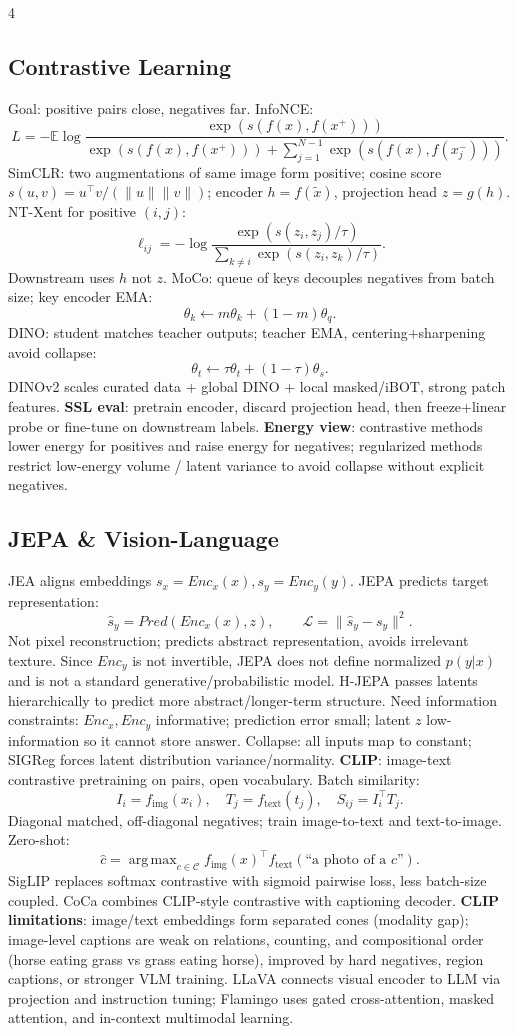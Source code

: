 \documentclass[8pt,a4paper,landscape]{extarticle}
\newcommand{\key}[1]{\textbf{#1}}
\newcommand{\E}{\mathbb{E}}
\DeclareMathOperator*{\argmax}{arg\,max}
\begin{document}
\begin{multicols*}{4}
\subsection{Contrastive Learning}
Goal: positive pairs close, negatives far. InfoNCE:
\[
L=-\E\log\frac{\exp(s(f(x),f(x^+)))}{\exp(s(f(x),f(x^+)))+\sum_{j=1}^{N-1}\exp(s(f(x),f(x_j^-)))}.
\]
SimCLR: two augmentations of same image form positive; cosine score $s(u,v)=u^\top v/(\|u\|\|v\|)$; encoder $h=f(\tilde x)$, projection head $z=g(h)$. NT-Xent for positive $(i,j)$:
\[
\ell_{ij}=-\log\frac{\exp(s(z_i,z_j)/\tau)}{\sum_{k\ne i}\exp(s(z_i,z_k)/\tau)}.
\]
Downstream uses $h$ not $z$. MoCo: queue of keys decouples negatives from batch size; key encoder EMA:
\[
\theta_k\leftarrow m\theta_k+(1-m)\theta_q.
\]
DINO: student matches teacher outputs; teacher EMA, centering+sharpening avoid collapse:
\[
\theta_t\leftarrow \tau\theta_t+(1-\tau)\theta_s.
\]
DINOv2 scales curated data + global DINO + local masked/iBOT, strong patch features. \key{SSL eval}: pretrain encoder, discard projection head, then freeze+linear probe or fine-tune on downstream labels. \key{Energy view}: contrastive methods lower energy for positives and raise energy for negatives; regularized methods restrict low-energy volume / latent variance to avoid collapse without explicit negatives.

\subsection{JEPA \& Vision-Language}
JEA aligns embeddings $s_x=Enc_x(x),s_y=Enc_y(y)$. JEPA predicts target representation:
\[
\hat s_y=Pred(Enc_x(x),z),\qquad \mathcal L=\|\hat s_y-s_y\|^2.
\]
Not pixel reconstruction; predicts abstract representation, avoids irrelevant texture. Since $Enc_y$ is not invertible, JEPA does not define normalized $p(y|x)$ and is not a standard generative/probabilistic model. H-JEPA passes latents hierarchically to predict more abstract/longer-term structure. Need information constraints: $Enc_x,Enc_y$ informative; prediction error small; latent $z$ low-information so it cannot store answer. Collapse: all inputs map to constant; SIGReg forces latent distribution variance/normality.
\key{CLIP}: image-text contrastive pretraining on pairs, open vocabulary. Batch similarity:
\[
I_i=f_{\mathrm{img}}(x_i),\quad T_j=f_{\mathrm{text}}(t_j),\quad S_{ij}=I_i^\top T_j.
\]
Diagonal matched, off-diagonal negatives; train image-to-text and text-to-image. Zero-shot:
\[
\hat c=\argmax_{c\in\mathcal C} f_{\mathrm{img}}(x)^\top f_{\mathrm{text}}(\text{``a photo of a }c\text{''}).
\]
SigLIP replaces softmax contrastive with sigmoid pairwise loss, less batch-size coupled. CoCa combines CLIP-style contrastive with captioning decoder. \key{CLIP limitations}: image/text embeddings form separated cones (modality gap); image-level captions are weak on relations, counting, and compositional order (horse eating grass vs grass eating horse), improved by hard negatives, region captions, or stronger VLM training. LLaVA connects visual encoder to LLM via projection and instruction tuning; Flamingo uses gated cross-attention, masked attention, and in-context multimodal learning.


\end{multicols*}
\end{document}
